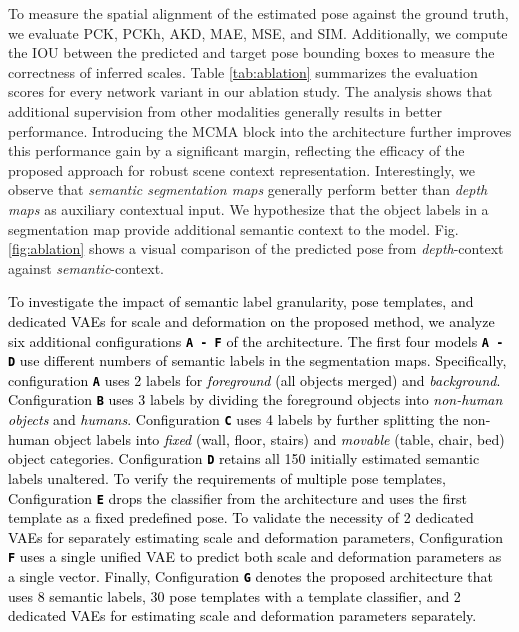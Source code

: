 To measure the spatial alignment of the estimated pose against the ground truth, we evaluate PCK, PCKh, AKD, MAE, MSE, and SIM. Additionally, we compute the IOU between the predicted and target pose bounding boxes to measure the correctness of inferred scales. Table \ref{tab:ablation} summarizes the evaluation scores for every network variant in our ablation study. The analysis shows that additional supervision from other modalities generally results in better performance. Introducing the MCMA block into the architecture further improves this performance gain by a significant margin, reflecting the efficacy of the proposed approach for robust scene context representation. Interestingly, we observe that \emph{semantic segmentation maps} generally perform better than \emph{depth maps} as auxiliary contextual input. We hypothesize that the object labels in a segmentation map provide additional semantic context to the model. Fig. \ref{fig:ablation} shows a visual comparison of the predicted pose from \emph{depth}-context against \emph{semantic}-context.

\textcolor{black}{To investigate the impact of semantic label granularity, pose templates, and dedicated VAEs for scale and deformation on the proposed method, we analyze six additional configurations \texttt{\textbf{A - F}} of the architecture. The first four models \texttt{\textbf{A - D}} use different numbers of semantic labels in the segmentation maps. Specifically, configuration \texttt{\textbf{A}} uses 2 labels for \emph{foreground} (all objects merged) and \emph{background}. Configuration \texttt{\textbf{B}} uses 3 labels by dividing the foreground objects into \emph{non-human objects} and \emph{humans}. Configuration \texttt{\textbf{C}} uses 4 labels by further splitting the non-human object labels into \emph{fixed} (wall, floor, stairs) and \emph{movable} (table, chair, bed) object categories. Configuration \texttt{\textbf{D}} retains all 150 initially estimated semantic labels unaltered. To verify the requirements of multiple pose templates, Configuration \texttt{\textbf{E}} drops the classifier from the architecture and uses the first template as a fixed predefined pose. To validate the necessity of 2 dedicated VAEs for separately estimating scale and deformation parameters, Configuration \texttt{\textbf{F}} uses a single unified VAE to predict both scale and deformation parameters as a single vector. Finally, Configuration \texttt{\textbf{G}} denotes the proposed architecture that uses 8 semantic labels, 30 pose templates with a template classifier, and 2 dedicated VAEs for estimating scale and deformation parameters separately.}

